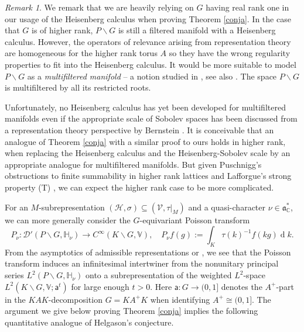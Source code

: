 \documentclass[a4paper,reqno]{amsart}
\numberwithin{equation}{section}
\def\rd{\operatorname{d}\!}
\def\C{\mathbb{C}}
\theoremstyle{definition}
\theoremstyle{remark}
\newtheorem{remark}[thm]{Remark}
\begin{document}
\begin{remark}
\label{alknalndarank}
We remark that we are heavily relying on $G$ having real rank one in our usage of the Heisenberg calculus when proving Theorem \ref{conja}. In the case that $G$ is of higher rank, $P\backslash G$ is still a filtered manifold with a Heisenberg calculus. However, the operators of relevance arising from representation theory are homogeneous for the higher rank torus $A$ so they have the wrong regularity properties to fit into the Heisenberg calculus. It would be more suitable to model $P\backslash G$ as a \emph{multifiltered manifold} -- a notion studied in \cite[Section 3.4]{yunckenhab}, see also \cite{yuncken2013}. The space $P\backslash G$ is multifiltered by all its restricted roots. 

Unfortunately, no Heisenberg calculus has yet been developed for multifiltered manifolds even if the appropriate scale of Sobolev spaces has been discussed from a representation theory perspective by Bernstein \cite{bernsteinmulti}. It is conceivable that an analogue of Theorem \ref{conja} with a similar proof to ours holds in higher rank, when replacing the Heisenberg calculus and the Heisenberg-Sobolev scale by an appropriate analogue for multifiltered manifolds. But given Puschnigg's obstructions to finite summability in higher rank lattices \cite{puschnigg} and Lafforgue's strong property (T) \cite{laffastrong}, we can expect the higher rank case to be more complicated.
\end{remark}



For an $M$-subrepresentation $(\mathcal{H},\sigma)\subseteq (\mathcal{V},\tau|_M)$ and a quasi-character $\nu\in \mathfrak{a}_\C^*$, we can more generally consider the $G$-equivariant Poisson transform 
\begin{equation}
\label{kwszeggeneric}
P_\nu:\mathcal{D}'(P\backslash G,\mathbb{H}_{\nu})\to C^\infty(K\backslash G,\mathbb{V}), \quad P_\nu f(g):=\int_K \tau(k)^{-1} f(kg)\rd k.
\end{equation}
From the asymptotics of admissible representations \cite[Chapter VIII]{knappbook} or \cite[Chapter 4]{wallachbook}, we see that the Poisson transform induces an infinitesimal intertwiner from the nonunitary principal series $L^2(P\backslash G,\mathbb{H}_{\nu})$ onto a subrepresentation of the weighted $L^2$-space $L^2(K\backslash G,\mathbb{V}; \mathsf{a}^t)$ for large enough $t>0$. Here $\mathsf{a}:G\to (0,1]$ denotes the $A^+$-part in the $KAK$-decomposition $G=KA^+K$ when identifying $A^+\cong (0,1]$. The argument we give below proving Theorem \ref{conja} implies the following quantitative analogue of Helgason's conjecture.
\end{document}
